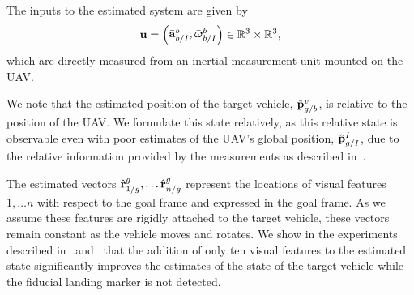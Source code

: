 The inputs to the estimated system are given by
\begin{equation}
  \boldsymbol{\mathrm{u}} = \begin{pmatrix} \bar{\boldsymbol{\mathrm{a}}}_{b/I}^b, \bar{\boldsymbol{\mathrm{\omega}}}_{b/I}^b \end{pmatrix} \in
        \mathbb{R}^3 \times \mathbb{R}^3,
\end{equation}
which are directly measured from an inertial measurement unit mounted on the UAV.


We note that the
estimated position of the target vehicle, $\hat{\boldsymbol{\mathrm{p}}}_{g/b}^v$, is relative to the position of the
UAV.
We formulate this state relatively,
as this relative state is observable even with poor estimates of the UAV's global
position, $\hat{\boldsymbol{\mathrm{p}}}_{g/I}^I$, due to the relative information provided
by the measurements as described in~.

The estimated vectors $\hat{\boldsymbol{\mathrm{r}}}_{1/g}^{g}, \dots \hat{\boldsymbol{\mathrm{r}}}_{n/g}^{g}$ represent the
locations of visual features $1, \dots n$ with respect to the goal frame and
expressed in the goal frame. As we assume these features are rigidly attached to the
target vehicle, these vectors remain constant as the vehicle moves and rotates.
We show in the experiments described in~
and~ that the
addition of only ten visual features to the estimated state significantly
improves the estimates of the state of the target vehicle
while the fiducial landing marker is not detected. 

